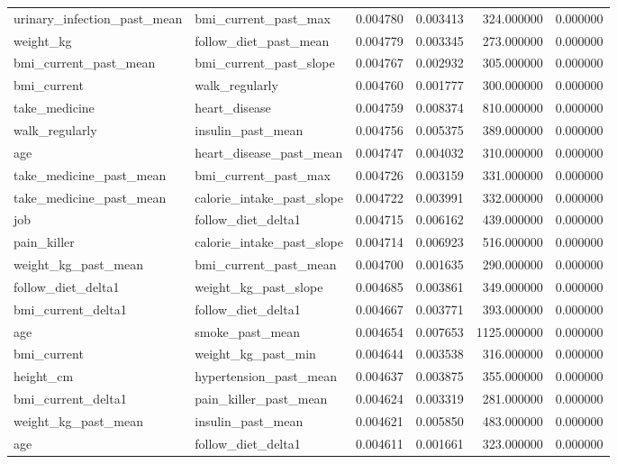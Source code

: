 \begin{longtable}{llrrrr}
urinary\_infection\_past\_mean & bmi\_current\_past\_max & 0.004780 & 0.003413 & 324.000000 & 0.000000 \\
weight\_kg & follow\_diet\_past\_mean & 0.004779 & 0.003345 & 273.000000 & 0.000000 \\
bmi\_current\_past\_mean & bmi\_current\_past\_slope & 0.004767 & 0.002932 & 305.000000 & 0.000000 \\
bmi\_current & walk\_regularly & 0.004760 & 0.001777 & 300.000000 & 0.000000 \\
take\_medicine & heart\_disease & 0.004759 & 0.008374 & 810.000000 & 0.000000 \\
walk\_regularly & insulin\_past\_mean & 0.004756 & 0.005375 & 389.000000 & 0.000000 \\
age & heart\_disease\_past\_mean & 0.004747 & 0.004032 & 310.000000 & 0.000000 \\
take\_medicine\_past\_mean & bmi\_current\_past\_max & 0.004726 & 0.003159 & 331.000000 & 0.000000 \\
take\_medicine\_past\_mean & calorie\_intake\_past\_slope & 0.004722 & 0.003991 & 332.000000 & 0.000000 \\
job & follow\_diet\_delta1 & 0.004715 & 0.006162 & 439.000000 & 0.000000 \\
pain\_killer & calorie\_intake\_past\_slope & 0.004714 & 0.006923 & 516.000000 & 0.000000 \\
weight\_kg\_past\_mean & bmi\_current\_past\_mean & 0.004700 & 0.001635 & 290.000000 & 0.000000 \\
follow\_diet\_delta1 & weight\_kg\_past\_slope & 0.004685 & 0.003861 & 349.000000 & 0.000000 \\
bmi\_current\_delta1 & follow\_diet\_delta1 & 0.004667 & 0.003771 & 393.000000 & 0.000000 \\
age & smoke\_past\_mean & 0.004654 & 0.007653 & 1125.000000 & 0.000000 \\
bmi\_current & weight\_kg\_past\_min & 0.004644 & 0.003538 & 316.000000 & 0.000000 \\
height\_cm & hypertension\_past\_mean & 0.004637 & 0.003875 & 355.000000 & 0.000000 \\
bmi\_current\_delta1 & pain\_killer\_past\_mean & 0.004624 & 0.003319 & 281.000000 & 0.000000 \\
weight\_kg\_past\_mean & insulin\_past\_mean & 0.004621 & 0.005850 & 483.000000 & 0.000000 \\
age & follow\_diet\_delta1 & 0.004611 & 0.001661 & 323.000000 & 0.000000 \\

\end{longtable}
